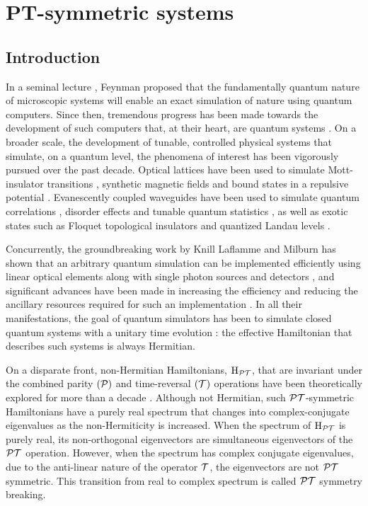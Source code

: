 \section{PT-symmetric systems}
\label{sec:PT}
\subsection{Introduction}
In a seminal lecture \cite{feynman-qsim}, Feynman proposed that the
fundamentally quantum nature of microscopic systems will enable an exact
simulation of nature using quantum computers. Since then, tremendous progress
has been made towards the development of such computers that, at their heart,
are quantum systems \cite{ladd-nature-464-45}. On a broader scale, the
development of tunable, controlled physical systems that simulate, on a quantum
level, the phenomena of interest has been vigorously pursued over the past
decade. Optical lattices have been used to simulate Mott-insulator transitions
\cite{jordens-nature-455-204}, synthetic magnetic fields
\cite{lin-nature-462-628} and bound states in a repulsive potential
\cite{winkler-nature-441-853}. Evanescently coupled waveguides
\cite{garanovich-waveguides-2012} have been used to simulate quantum
correlations \cite{peruzzo-science-329-1500}, disorder effects
\cite{crespi-nphoton-7-322} and tunable quantum statistics
\cite{matthews-scirep-3-1539}, as well as exotic states such as Floquet
topological insulators \cite{rechtsman-nature-496-196,
khanikaev-natmater-12-233} and quantized Landau levels
\cite{rechtsman-nphoton-7-153}.

Concurrently, the groundbreaking work by Knill Laflamme and Milburn
\cite{knill-nature-409-46} has shown that an arbitrary quantum simulation can be
implemented efficiently using linear optical elements along with single photon
sources and detectors \cite{kok-revmodphys-79-135}, and significant advances
have been made in increasing the efficiency and reducing the ancillary resources
required for such an implementation \cite{obrien-science-308-1567,
obrien-natphoton-3-687}. In all their manifestations, the goal of quantum
simulators has been to simulate closed quantum systems with a unitary time
evolution \cite{cirac-natphys-8-264}: the effective Hamiltonian that describes
such systems is always Hermitian.

On a disparate front, non-Hermitian Hamiltonians, \(\mathrm{H}_{\mathcal{PT}}\), that are
invariant under the combined parity \((\mathcal{P})\) and time-reversal
\((\mathcal{T})\) operations have been theoretically explored for more than a
decade \cite{bender-physrevlett-80-5243, levai-jphysa-33-7165,
bender-repprogphys-70-947}. Although not Hermitian, such \(\mathcal{PT}\)-symmetric
Hamiltonians have a purely real spectrum that changes into complex-conjugate
eigenvalues as the non-Hermiticity is increased. When the spectrum of
\(\mathrm{H}_{\mathcal{PT}}\) is purely real, its non-orthogonal eigenvectors are
simultaneous eigenvectors of the \(\mathcal{PT}\) operation. However, when the spectrum
has complex conjugate eigenvalues, due to the anti-linear nature of the operator
\(\mathcal{T}\), the eigenvectors are not \(\mathcal{PT}\) symmetric. This transition from
real to complex spectrum is called \(\mathcal{PT}\) symmetry breaking. 


